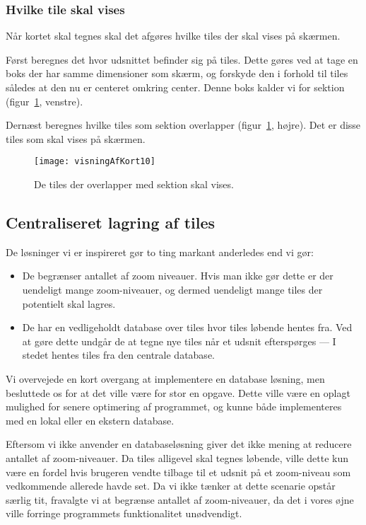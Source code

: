 \subsubsection{Hvilke tile skal vises}
\label{subsec:hvilkeTilesSkalVises}

Når kortet skal tegnes skal det afgøres hvilke tiles der skal vises på skærmen.

Først beregnes det hvor udsnittet befinder sig på tiles. Dette gøres ved at tage en boks der har samme dimensioner som skærm, og forskyde den i forhold til tiles således at den nu er centeret omkring center. Denne boks kalder vi for sektion (figur~\ref{figur:visningAfKort10}, venstre).

Dernæst beregnes hvilke tiles som sektion overlapper (figur~\ref{figur:visningAfKort10}, højre). Det er disse tiles som skal vises på skærmen.

\begin{figure}[h]
	\centering
	\texttt{[image: visningAfKort10]}
	\captionsetup{width=0.8\textwidth}
	\caption{De tiles der overlapper med sektion skal vises.}
	\label{figur:visningAfKort10}
\end{figure}

\subsection{Centraliseret lagring af tiles}
\label{subsec:centraliseretLagringAfTiles}

De løsninger vi er inspireret gør to ting markant anderledes end vi gør:

\begin{itemize}
	\item De begrænser antallet af zoom niveauer. Hvis man ikke gør dette er der uendeligt mange zoom-niveauer, og dermed uendeligt mange tiles der potentielt skal lagres.
	\item De har en vedligeholdt database over tiles hvor tiles løbende hentes fra. Ved at gøre dette undgår de at tegne nye tiles når et udsnit efterspørges --- I stedet hentes tiles fra den centrale database.
\end{itemize}

Vi overvejede en kort overgang at implementere en database løsning, men besluttede os for at det ville være for stor en opgave. Dette ville være en oplagt mulighed for senere optimering af programmet, og kunne både implementeres med en lokal eller en ekstern database.

Eftersom vi ikke anvender en databaseløsning giver det ikke mening at reducere antallet af zoom-niveauer. Da tiles alligevel skal tegnes løbende, ville dette kun være en fordel hvis brugeren vendte tilbage til et udsnit på et zoom-niveau som vedkommende allerede havde set. Da vi ikke tænker at dette scenarie opstår særlig tit, fravalgte vi at begrænse antallet af zoom-niveauer, da det i vores øjne ville forringe programmets funktionalitet unødvendigt.

